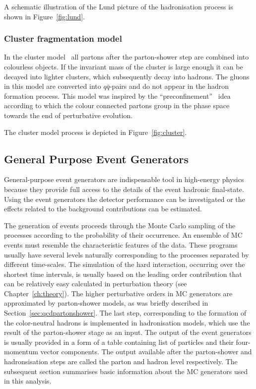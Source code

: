 A schematic illustration of the Lund picture of the hadronisation process is shown in Figure~\ref{fig:lund}.
\subsubsection{Cluster fragmentation model}
In the cluster model~\cite{clustemodel} all partons after the parton-shower step are combined into colourless objects. If the invariant mass of the cluster is large enough it can be decayed into lighter clusters, which subsequently decay into hadrons. The gluons in this model are converted into $q\bar{q}$-pairs and do not appear in the hadron formation process. This model was inspired by the ``preconfinement''~\cite{preconfinement} idea according to which the colour connected partons group in the phase space towards the end of perturbative evolution.

The cluster model process is depicted in Figure~\ref{fig:cluster}.
\subsection{General Purpose Event Generators}
General-purpose event generators are indispensable tool in high-energy physics because they provide full access to the details of the event hadronic final-state. Using the event generators the detector performance can be investigated or the effects related to the background contributions can be estimated.

The generation of events proceeds through the Monte Carlo sampling of the processes according to the probability of their occurrence. An ensemble of MC events must resemble the characteristic features of the data. These programs usually have several levels naturally corresponding to the processes separated by different time-scales. The simulation of the hard interaction, occurring over the shortest time intervals, is usually based on the leading order contribution that can be relatively easy calculated in perturbation theory (see Chapter~\ref{ch:theory}). The higher perturbative orders in MC generators are approximated by parton-shower models, as was briefly described in Section~\ref{sec:qcdpartonshower}. The last step, corresponding to the formation of the color-neutral hadrons is implemented in hadronisation models, which use the result of the parton-shower stage as an input. The output of the event generators is usually provided in a form of a table containing list of particles and their four-momentum vector components. The output available after the parton-shower and hadronsisation steps are called the parton and hadron level respectively. The subsequent section summarises basic information about the MC generators used in this analysis.

